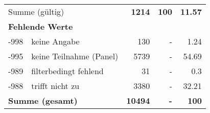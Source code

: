 \begin{longtable}{lXrrr}
     \midrule
     \multicolumn{2}{l}{Summe (gültig)} &
       \textbf{\num{1214}} &
     \textbf{\num{100}} &
       \textbf{\num[round-mode=places,round-precision=2]{11.57}} \\
     \multicolumn{5}{l}{\textbf{Fehlende Werte}}\\
       -998 &
       keine Angabe &
         \num{130} &
        - &
         \num[round-mode=places,round-precision=2]{1.24} \\
       -995 &
       keine Teilnahme (Panel) &
         \num{5739} &
        - &
         \num[round-mode=places,round-precision=2]{54.69} \\
       -989 &
       filterbedingt fehlend &
         \num{31} &
        - &
         \num[round-mode=places,round-precision=2]{0.3} \\
       -988 &
       trifft nicht zu &
         \num{3380} &
        - &
         \num[round-mode=places,round-precision=2]{32.21} \\
     \midrule
     \multicolumn{2}{l}{\textbf{Summe (gesamt)}} &
          \textbf{\num{10494}} &
        \textbf{-} &
        \textbf{\num{100}} \\
     \bottomrule
     \end{longtable}
     
